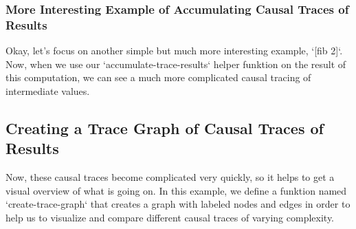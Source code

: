 \subsubsection{More Interesting Example of Accumulating Causal Traces of Results}

Okay, let's focus on another simple but much more interesting example,
`[fib 2]`.  Now, when we use our `accumulate-trace-results` helper
funktion on the result of this computation, we can see a much more
complicated causal tracing of intermediate values.

%
%
%

\subsection{Creating a Trace Graph of Causal Traces of Results}

Now, these causal traces become complicated very quickly, so it helps
to get a visual overview of what is going on.  In this example, we
define a funktion named `create-trace-graph` that creates a graph with
labeled nodes and edges in order to help us to visualize and compare
different causal traces of varying complexity.

%

